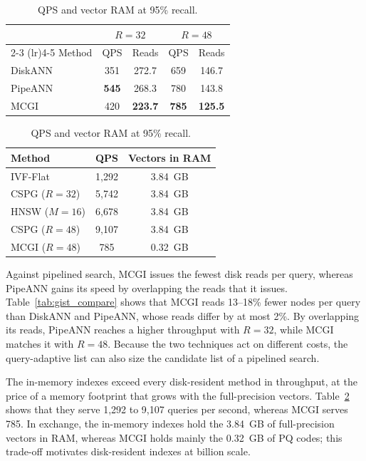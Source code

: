 \documentclass{article}
\theoremstyle{plain}
\theoremstyle{definition}
\theoremstyle{remark}
\newcommand{\ours}{MCGI\xspace}
\begin{document}
\begin{table}[t]
\centering
\small
\begin{minipage}[t]{0.54\textwidth}
\centering
\caption{QPS and disk reads per query at 95\% recall.}
\label{tab:gist_compare}
\begin{tabular}{lcccc}
\toprule
 & \multicolumn{2}{c}{$R = 32$} & \multicolumn{2}{c}{$R = 48$} \\
\cmidrule(lr){2-3} \cmidrule(lr){4-5}
Method & QPS & Reads & QPS & Reads \\
\midrule
DiskANN & 351 & 272.7 & 659 & 146.7 \\
PipeANN & \textbf{545} & 268.3 & 780 & 143.8 \\
\ours{} & 420 & \textbf{223.7} & \textbf{785} & \textbf{125.5} \\
\bottomrule
\end{tabular}
\end{minipage}
\hfill
\begin{minipage}[t]{0.44\textwidth}
\centering
\caption{QPS and vector RAM at 95\% recall.}
\label{tab:memory_compare}
\setlength{\tabcolsep}{4pt}
\begin{tabular}{lcc}
\toprule
Method & QPS & Vectors in RAM \\
\midrule
IVF-Flat & 1{,}292 & 3.84~GB \\
CSPG ($R = 32$) & 5{,}742 & 3.84~GB \\
HNSW ($M = 16$) & 6{,}678 & 3.84~GB \\
CSPG ($R = 48$) & 9{,}107 & 3.84~GB \\
\ours{} ($R = 48$) & 785 & 0.32~GB \\
\bottomrule
\end{tabular}
\end{minipage}
\end{table}

Against pipelined search, \ours{} issues the fewest disk reads per query, whereas PipeANN gains its speed by overlapping the reads that it issues. Table~\ref{tab:gist_compare} shows that \ours{} reads 13--18\% fewer nodes per query than DiskANN and PipeANN, whose reads differ by at most 2\%. By overlapping its reads, PipeANN reaches a higher throughput with $R = 32$, while \ours{} matches it with $R = 48$. Because the two techniques act on different costs, the query-adaptive list can also size the candidate list of a pipelined search.

The in-memory indexes exceed every disk-resident method in throughput, at the price of a memory footprint that grows with the full-precision vectors. Table~\ref{tab:memory_compare} shows that they serve 1{,}292 to 9{,}107 queries per second, whereas \ours{} serves 785. In exchange, the in-memory indexes hold the 3.84~GB of full-precision vectors in RAM, whereas \ours{} holds mainly the 0.32~GB of PQ codes; this trade-off motivates disk-resident indexes at billion scale.
\end{document}
